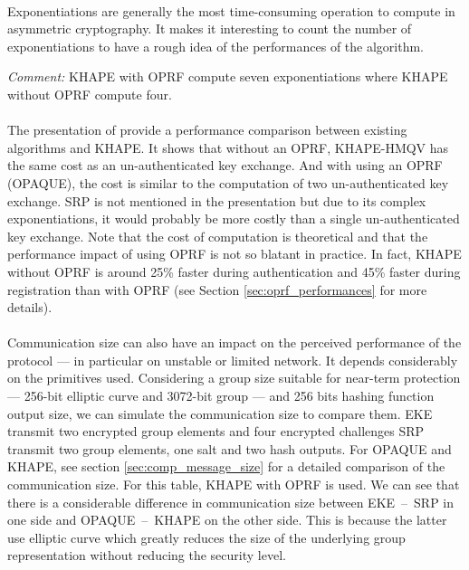 ﻿\documentclass[../report.tex]{subfiles}
\begin{document}
\paragraph{}
Exponentiations are generally the most time-consuming operation to compute in asymmetric cryptography. It makes it interesting to count the number of exponentiations to have a rough idea of the performances of the algorithm.

\emph{Comment:} KHAPE with OPRF compute seven exponentiations where KHAPE without OPRF compute four.


\paragraph{}
The presentation of \cite{KHAPE_Paper} provide a performance comparison between existing algorithms and KHAPE. It shows that without an OPRF, KHAPE-HMQV has the same cost as an un-authenticated key exchange. And with using an OPRF (OPAQUE), the cost is similar to the computation of two un-authenticated key exchange.
SRP is not mentioned in the presentation but due to its complex exponentiations, it would probably be more costly than a single un-authenticated key exchange.
Note that the cost of computation is theoretical and that the performance impact of using OPRF is not so blatant in practice. In fact, KHAPE without OPRF is around 25\% faster during authentication and 45\% faster during registration than with OPRF (see Section \ref{sec:oprf_performances} for more details).


\paragraph{}
Communication size can also have an impact on the perceived performance of the protocol --- in particular on unstable or limited network.
It depends considerably on the primitives used. Considering a group size suitable for near-term protection \cite{ECRYPT_Keylength} --- 256-bit elliptic curve and 3072-bit group --- and 256 bits hashing function output size, we can simulate the communication size to compare them.
EKE transmit two encrypted group elements and four encrypted challenges
SRP transmit two group elements, one salt and two hash outputs.
For OPAQUE and KHAPE, see section \ref{sec:comp_message_size} for a detailed comparison of the communication size. For this table, KHAPE with OPRF is used.
We can see that there is a considerable difference in communication size between EKE~--~SRP in one side and OPAQUE~--~KHAPE on the other side. This is because the latter use elliptic curve which greatly reduces the size of the underlying group representation without reducing the security level.
\end{document}
